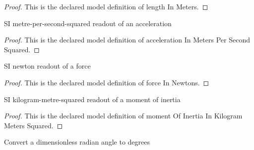 \begin{proof}
  This is the declared model definition of length In Meters.
\end{proof}
\begin{definition}
  \label{def:physics:phyx-mini-0785:phyxminiproblems-problemphyxmini0785-accelerationinmeterspersecondsquared}
  SI metre-per-second-squared readout of an acceleration
\end{definition}
\begin{proof}
  This is the declared model definition of acceleration In Meters Per Second Squared.
\end{proof}
\begin{definition}
  \label{def:physics:phyx-mini-0785:phyxminiproblems-problemphyxmini0785-forceinnewtons}
  SI newton readout of a force
\end{definition}
\begin{proof}
  This is the declared model definition of force In Newtons.
\end{proof}
\begin{definition}
  \label{def:physics:phyx-mini-0785:phyxminiproblems-problemphyxmini0785-momentofinertiainkilogrammeterssquared}
  SI kilogram-metre-squared readout of a moment of inertia
\end{definition}
\begin{proof}
  This is the declared model definition of moment Of Inertia In Kilogram Meters Squared.
\end{proof}
\begin{definition}
  \label{def:physics:phyx-mini-0785:phyxminiproblems-problemphyxmini0785-radianstodegrees}
  Convert a dimensionless radian angle to degrees
\end{definition}
